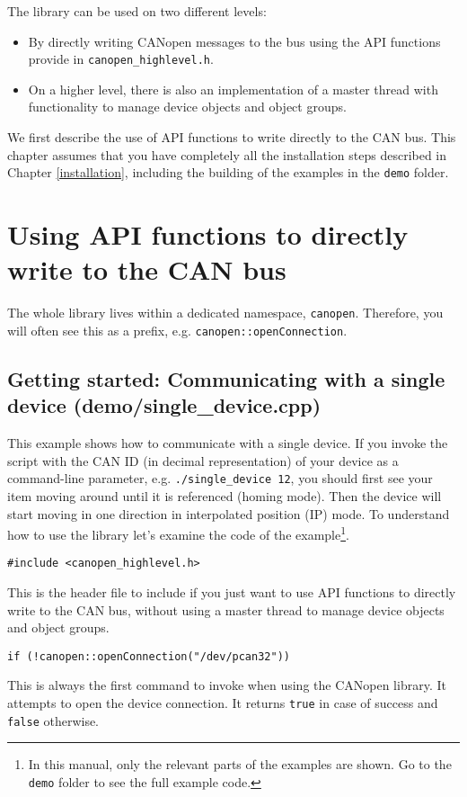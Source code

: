 The library can be used on two different levels:
\begin{itemize}
\item By directly writing CANopen messages to the bus using the API functions provide in \texttt{canopen\_highlevel.h}.
\item On a higher level, there is also an implementation of a master thread with functionality to manage device objects and object groups.
\end{itemize}

We first describe the use of API functions to write directly to the CAN bus. This chapter assumes that you have completely all the installation steps described in Chapter \ref{installation}, including the building of the examples in the \texttt{demo} folder.

\section{Using API functions to directly write to the CAN bus}

The whole library lives within a dedicated namespace, \texttt{canopen}. Therefore, you will often see this as a prefix, e.g. \texttt{canopen::openConnection}.

\subsection{Getting started: Communicating with a single device (demo/single\_device.cpp)}

This example shows how to communicate with a single device. If you invoke the script with the CAN ID (in decimal representation) of your device as a command-line parameter, e.g. \texttt{./single\_device 12}, you should first see your item moving around until it is referenced (homing mode). Then the device will start moving in one direction in interpolated position (IP) mode. To understand how to use the library let's examine the code of the example\footnote{In this manual, only the relevant parts of the examples are shown. Go to the \texttt{demo} folder to see the full example code.}.

\begin{verbatim}
#include <canopen_highlevel.h>
\end{verbatim}
This is the header file to include if you just want to use API functions to directly write to the CAN bus, without using a master thread to manage device objects and object groups.

\begin{verbatim}
if (!canopen::openConnection("/dev/pcan32"))
\end{verbatim}
This is always the first command to invoke when using the CANopen library. It attempts to open the device connection. It returns \texttt{true} in case of success and \texttt{false} otherwise.

